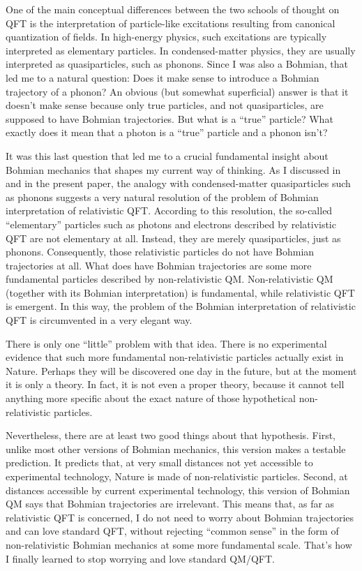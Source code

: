 \documentclass[12pt]{article}
\begin{document}
One of the main conceptual differences between the two schools of thought on QFT is the interpretation of particle-like 
excitations resulting from canonical quantization of fields. 
In high-energy physics, such excitations are typically interpreted as elementary particles. 
In condensed-matter physics, they are usually interpreted as quasiparticles, such as phonons. 
Since I was also a Bohmian, that led me to a natural question: Does it make sense to introduce a Bohmian trajectory of a phonon? 
An obvious (but somewhat superficial) answer is that it doesn't make sense because only true particles, and not quasiparticles, 
are supposed to have Bohmian trajectories. But what is a ``true'' particle? What exactly does it mean that a photon is a 
``true'' particle and a phonon isn't?

It was this last question that led me to a crucial fundamental insight about Bohmian mechanics that shapes my current 
way of thinking.
As I discussed in \cite{nikIBM} and in the present paper, 
the analogy with condensed-matter quasiparticles such as phonons suggests a very natural resolution of the 
problem of Bohmian interpretation of relativistic QFT. According to this resolution, the so-called “elementary” 
particles such as photons and electrons described by relativistic QFT are not elementary at all. 
Instead, they are merely quasiparticles, just as phonons. Consequently, those relativistic particles 
do not have Bohmian trajectories at all. What does have Bohmian trajectories are some more fundamental 
particles described by non-relativistic QM. Non-relativistic QM (together with its Bohmian interpretation) is fundamental, 
while relativistic QFT is emergent. In this way, the problem of the Bohmian interpretation of relativistic QFT is circumvented 
in a very elegant way.

There is only one ``little'' problem with that idea. There is no experimental evidence that such more fundamental 
non-relativistic particles actually exist in Nature. Perhaps they will be discovered one day in the future, 
but at the moment it is only a theory. In fact, it is not even a proper theory, 
because it cannot tell anything more specific about the exact nature of those hypothetical non-relativistic particles.

Nevertheless, there are at least two good things about that hypothesis. First, unlike most other versions of Bohmian mechanics, 
this version makes a testable prediction. It predicts that, at very small distances not yet accessible to experimental 
technology, Nature is made of non-relativistic particles. Second, at distances accessible by current experimental technology, 
this version of Bohmian QM says that Bohmian trajectories are irrelevant. This means that, as far as relativistic QFT is 
concerned, I do not need to worry about Bohmian trajectories and can love standard QFT, without rejecting ``common sense'' 
in the form of non-relativistic Bohmian mechanics at some more fundamental scale. That's how I finally 
learned to stop worrying and love standard QM/QFT.
\end{document}
